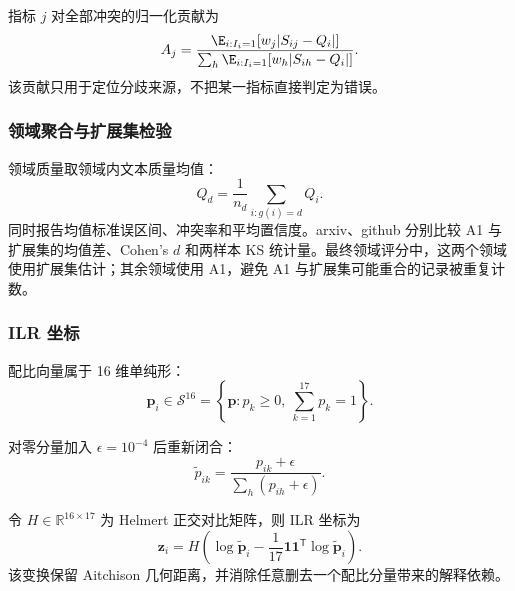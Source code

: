 \documentclass[bwprint]{gmcmthesis}
\begin{document}
        指标 $j$ 对全部冲突的归一化贡献为
        \begin{equation}
        A_j=\frac{\E_{i:I_i=1}[w_j|S_{ij}-Q_i|]}
        {\sum_h\E_{i:I_i=1}[w_h|S_{ih}-Q_i|]}.
        \label{eq:attribution}
        \end{equation}
        该贡献只用于定位分歧来源，不把某一指标直接判定为错误。

        
        \subsubsection{领域聚合与扩展集检验}  %
        领域质量取领域内文本质量均值：
        \begin{equation}
        Q_d=\frac1{n_d}\sum_{i:g(i)=d}Q_i.
        \label{eq:domainq}
        \end{equation}
        同时报告均值标准误区间、冲突率和平均置信度。arxiv、github 分别比较 A1 与扩展集的均值差、Cohen's $d$ 和两样本 KS 统计量。最终领域评分中，这两个领域使用扩展集估计；其余领域使用 A1，避免 A1 与扩展集可能重合的记录被重复计数。
        
        
        \subsubsection{ILR 坐标}  %
        配比向量属于 16 维单纯形：
        \begin{equation}
        \bm p_i\in\mathcal S^{16}=\left\{\bm p:p_k\ge0,\ \sum_{k=1}^{17}p_k=1\right\}.
        \label{eq:simplex}
        \end{equation}
        
        对零分量加入 $\epsilon=10^{-4}$ 后重新闭合：
        \begin{equation}
        \widetilde p_{ik}=\frac{p_{ik}+\epsilon}{\sum_h(p_{ih}+\epsilon)}.
        \label{eq:closure}
        \end{equation}
        
        令 $H\in\mathbb R^{16\times17}$ 为 Helmert 正交对比矩阵，则 ILR 坐标为
        \begin{equation}
        \bm z_i=H\left(\log\widetilde{\bm p}_i-
        \frac1{17}\bm 1\bm 1^{\mathsf T}\log\widetilde{\bm p}_i\right).
        \label{eq:ilr}
        \end{equation}
        该变换保留 Aitchison 几何距离，并消除任意删去一个配比分量带来的解释依赖。

        
\end{document}
